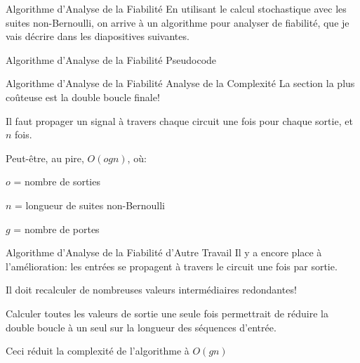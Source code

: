 \documentclass [12pt]{beamer}
\begin{document}
\begin{frame}{Algorithme d'Analyse de la Fiabilité}
En utilisant le calcul stochastique avec les suites non-Bernoulli, on arrive à un algorithme pour analyser de fiabilité, que je vais décrire dans les diapositives suivantes.
\end{frame}

\begin{frame}[fragile]{Algorithme d'Analyse de la Fiabilité \small Pseudocode}
\begin{algorithm}[H]
\end{algorithm}
\end{frame}

\begin{frame}{Algorithme d'Analyse de la Fiabilité \small Analyse de la Complexité}
La section la plus coûteuse est la double boucle finale!
\vspace{0.25 cm}

Il faut propager un signal à travers chaque circuit une fois pour chaque sortie, et $n$ fois.
\vspace{0.25 cm}

Peut-être, au pire, $O(ogn)$, où:

$o$ = nombre de sorties

$n$ = longueur de suites non-Bernoulli

$g$ = nombre de portes
\end{frame}

\begin{frame}[fragile]{Algorithme d'Analyse de la Fiabilité \small d'Autre Travail}
Il y a encore place à l'amélioration: les entrées se propagent à travers le circuit une fois par sortie.
\vspace{0.25 cm}

Il doit recalculer de nombreuses valeurs intermédiaires redondantes!
\vspace{0.25 cm}

Calculer toutes les valeurs de sortie une seule fois permettrait de réduire la double boucle à un seul sur la longueur des séquences d'entrée.
\vspace{0.25 cm}

Ceci réduit la complexité de l'algorithme à $O(gn)$
\end{frame}
\end{document}
